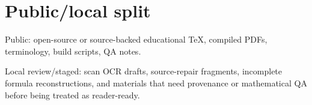 \section{Public/local split}

Public: open-source or source-backed educational TeX, compiled PDFs, terminology, build scripts, QA notes.

Local review/staged: scan OCR drafts, source-repair fragments, incomplete formula reconstructions, and materials that need provenance or mathematical QA before being treated as reader-ready.

